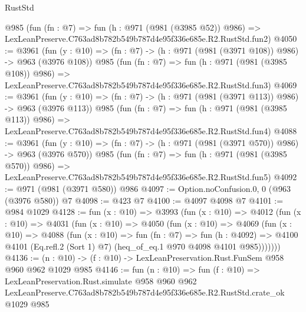 \begin{lexlean}{RustStd}
\begin{coremodule}
    @985
    (fun (fn : @7) =>
    fun (h : @971 (@981 (@3985 @52)) @986) =>
    LexLeanPreserve.C763ad8b782b549b787d4e95f336e685e.R2.RustStd.fun2)
@4050 := @3961
    (fun (y : @10) => (fn : @7) -> (h : @971 (@981 (@3971 @108)) @986) -> @963 (@3976 @108))
    @985
    (fun (fn : @7) =>
    fun (h : @971 (@981 (@3985 @108)) @986) =>
    LexLeanPreserve.C763ad8b782b549b787d4e95f336e685e.R2.RustStd.fun3)
@4069 := @3961
    (fun (y : @10) => (fn : @7) -> (h : @971 (@981 (@3971 @113)) @986) -> @963 (@3976 @113))
    @985
    (fun (fn : @7) =>
    fun (h : @971 (@981 (@3985 @113)) @986) =>
    LexLeanPreserve.C763ad8b782b549b787d4e95f336e685e.R2.RustStd.fun4)
@4088 := @3961
    (fun (y : @10) => (fn : @7) -> (h : @971 (@981 (@3971 @570)) @986) -> @963 (@3976 @570))
    @985
    (fun (fn : @7) =>
    fun (h : @971 (@981 (@3985 @570)) @986) =>
    LexLeanPreserve.C763ad8b782b549b787d4e95f336e685e.R2.RustStd.fun5)
@4092 := @971 (@981 (@3971 @580)) @986
@4097 := Option.noConfusion.{0, 0} (@963 (@3976 @580)) @7
@4098 := @423 @7
@4100 := @4097 @4098 @7
@4101 := @984 @1029
@4128 := fun (x : @10) =>
  @3993
    (fun (x : @10) =>
    @4012
      (fun (x : @10) =>
      @4031
        (fun (x : @10) =>
        @4050
          (fun (x : @10) =>
          @4069
            (fun (x : @10) =>
            @4088
              (fun (x : @10) =>
              fun (fn : @7) =>
              fun (h : @4092) =>
              @4100 @4101 (Eq.refl.{2} (Sort 1) @7) (heq_of_eq.{1} @970 @4098 @4101 @985)))))))
@4136 := (n : @10) -> (f : @10) -> LexLeanPreservation.Rust.FunSem @958 @960 @962 @1029 @985
@4146 := fun (n : @10) =>
  fun (f : @10) =>
  LexLeanPreservation.Rust.simulate
    @958
    @960
    @962
    LexLeanPreserve.C763ad8b782b549b787d4e95f336e685e.R2.RustStd.crate_ok
    @1029
    @985
\end{coremodule}
\end{lexlean}
